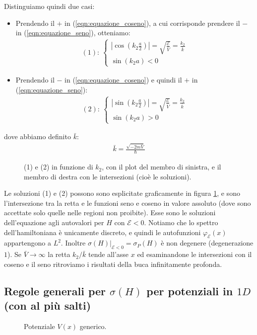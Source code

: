 \documentclass[../../FisicaTeorica.tex]{subfiles}
\begin{document}
Distinguiamo quindi due casi:
\begin{itemize}
\item Prendendo il $+$ in (\ref{eqn:equazione_coseno}), a cui corrisponde prendere il $-$ in (\ref{eqn:equazione_seno}), otteniamo:
\begin{align*}
(1):\>
\begin{cases}
\left|\cos\left(k_2 \frac{a}{2}\right)\right| = \sqrt{\frac{\mathcal{E}}{\bar{V}}}=\frac{k_2}{\bar{k}}\\
\sin(k_2 a) < 0
\end{cases}
\end{align*} 
\item Prendendo il $-$ in (\ref{eqn:equazione_coseno}) e quindi il $+$ in (\ref{eqn:equazione_seno}):
\begin{align*}
(2):\>\begin{cases}
\left|\sin\left(k_2\frac{a}{2}\right)\right| = \sqrt{\frac{\mathcal{E}}{\bar{V}}}=\frac{k_2}{\bar{k}}\\
\sin(k_2 a)>0
\end{cases}
\end{align*}
\end{itemize}
dove abbiamo definito $\bar{k}$:
\begin{align*}
\bar{k} = \frac{\sqrt{-2m\bar{V}}}{\hbar}
\end{align*}

\begin{figure}
\centering

\caption{(1) e (2) in funzione di $k_2$, con il plot del membro di sinistra, e il membro di destra con le intersezioni (cioè le soluzioni).}
\label{fig:solution1and2}
\end{figure}
Le soluzioni (1) e (2) possono sono esplicitate graficamente in figura \ref{fig:solution1and2}, e sono l'intersezione tra la retta e le funzioni seno e coseno in valore assoluto (dove sono accettate solo quelle nelle regioni non proibite). Esse sono le soluzioni dell'equazione agli autovalori per $H$ con $\mathcal{E}<0$. Notiamo che lo spettro dell'hamiltoniana è unicamente discreto, e quindi le autofunzioni $\varphi_\mathcal{E}(x)$ appartengono a $L^2$. Inoltre $\sigma(H)|_{\mathcal{E}<0}=\sigma_P(H)$ è non degenere (degenerazione $1$). Se $\bar{V}\to\infty$ la retta $k_2/\bar{k}$ tende all'asse $x$ ed esaminandone le intersezioni con il coseno e il seno ritroviamo i risultati della buca infinitamente profonda.\\

\subsection{Regole generali per $\sigma(H)$ per potenziali in $1D$ (con al più salti)}
\label{sec:potenziali_generici}
\begin{figure}[H]
\centering

\caption{Potenziale $V(x)$ generico.}
\end{figure}
\end{document}
